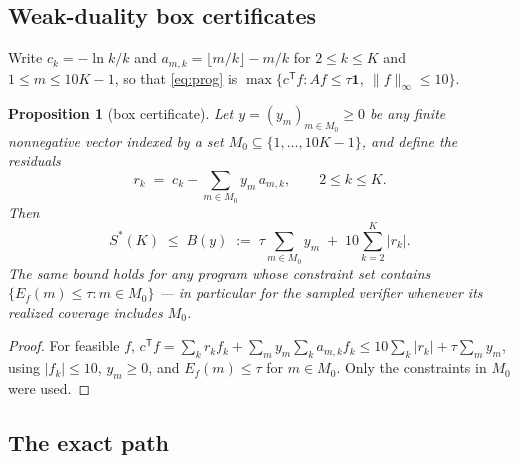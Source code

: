 \documentclass[11pt]{article}
\newtheorem{proposition}[theorem]{Proposition}
\theoremstyle{remark}
\newcommand{\Sstar}{S^{*}}
\begin{document}
\subsection{Weak-duality box certificates}

Write $c_k = -\ln k / k$ and $a_{m,k} = \lfloor m/k \rfloor - m/k$ for
$2 \le k \le K$ and $1 \le m \le 10K - 1$, so that \eqref{eq:prog} is
$\max \{ c^{\mathsf T} f : A f \le \tau \mathbf{1},\ \|f\|_\infty \le 10
\}$.

\begin{proposition}[box certificate]\label{prop:box}
Let $y = (y_m)_{m \in M_0} \ge 0$ be any finite nonnegative vector indexed
by a set $M_0 \subseteq \{1, \dots, 10K-1\}$, and define the residuals
\[
r_k \;=\; c_k - \sum_{m \in M_0} y_m\, a_{m,k}, \qquad 2 \le k \le K .
\]
Then
\[
\Sstar(K) \;\le\; B(y) \;:=\; \tau \sum_{m \in M_0} y_m \;+\;
10 \sum_{k=2}^{K} |r_k| .
\]
The same bound holds for any program whose constraint set contains
$\{ E_f(m) \le \tau : m \in M_0 \}$ --- in particular for the sampled
verifier whenever its realized coverage includes $M_0$.
\end{proposition}

\begin{proof}
For feasible $f$,
$c^{\mathsf T} f = \sum_k r_k f_k + \sum_{m} y_m \sum_k a_{m,k} f_k
\le 10 \sum_k |r_k| + \tau \sum_m y_m$, using $|f_k| \le 10$,
$y_m \ge 0$, and $E_f(m) \le \tau$ for $m \in M_0$. Only the constraints
in $M_0$ were used.
\end{proof}

\subsection{The exact path}\label{sec:exact}
\end{document}
